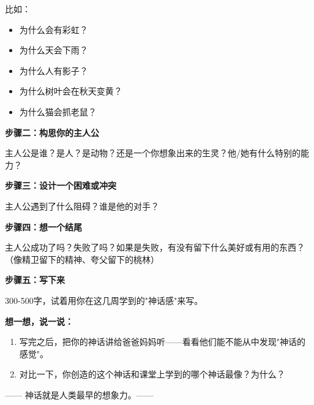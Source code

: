 \documentclass[a4paper,12pt]{ctexart}
\newcommand{\thinktitle}{%
  \vspace{0.3cm}
  {\large\textcolor{orange!80!black}{\textbf{想一想，说一说：}}}
}
\begin{document}
比如：
\begin{itemize}
  \item 为什么会有彩虹？
  \item 为什么天会下雨？
  \item 为什么人有影子？
  \item 为什么树叶会在秋天变黄？
  \item 为什么猫会抓老鼠？
\end{itemize}

\textbf{步骤二：构思你的主人公}

主人公是谁？是人？是动物？还是一个你想象出来的生灵？他/她有什么特别的能力？

\textbf{步骤三：设计一个困难或冲突}

主人公遇到了什么阻碍？谁是他的对手？

\textbf{步骤四：想一个结尾}

主人公成功了吗？失败了吗？如果是失败，有没有留下什么美好或有用的东西？（像精卫留下的精神、夸父留下的桃林）

\textbf{步骤五：写下来}

300-500字，试着用你在这几周学到的"神话感"来写。

\vspace{0.5cm}

\thinktitle
\vspace{0.1cm}
\begin{enumerate}
  \item 写完之后，把你的神话讲给爸爸妈妈听——看看他们能不能从中发现"神话的感觉"。
  \item 对比一下，你创造的这个神话和课堂上学到的哪个神话最像？为什么？
\end{enumerate}

\vspace{1cm}
\begin{center}
\textcolor{blue!70!black}{\large —— 神话就是人类最早的想象力。—— }
\end{center}
\end{document}
